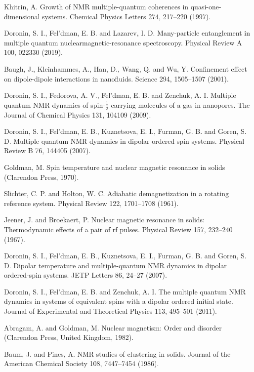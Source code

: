 \documentclass[utf8]{jetp}
\begin{document}
\begin{thebibliography}{35}
Khitrin, A. Growth of NMR multiple-quantum coherences in quasi-one-dimensional systems. Chemical
Physics Letters 274, 217–220 (1997).

Doronin, S. I., Fel'dman, E. B. and  Lazarev, I. D. Many-particle entanglement in multiple quantum nuclearmagnetic-resonance spectroscopy. Physical Review A 100, 022330 (2019).

Baugh, J., Kleinhammes, A., Han, D., Wang, Q. and  Wu, Y. Confinement effect on dipole-dipole interactions in nanofluids. Science 294, 1505–1507 (2001).

Doronin, S. I., Fedorova, A. V., Fel’dman, E. B. and  Zenchuk, A. I. Multiple quantum NMR dynamics of spin-$\frac 1 2$ carrying molecules of a gas in nanopores. The Journal of Chemical Physics 131, 104109 (2009).

Doronin, S. I., Fel’dman, E. B., Kuznetsova, E. I., Furman, G. B. and  Goren, S. D. Multiple quantum NMR dynamics in dipolar ordered spin systems. Physical Review B 76, 144405 (2007).

Goldman, M. Spin temperature and nuclear magnetic resonance in solids (Clarendon Press, 1970).

Slichter, C. P. and  Holton, W. C. Adiabatic demagnetization in a rotating reference system. Physical Review 122, 1701–1708 (1961).

Jeener, J. and  Broekaert, P. Nuclear magnetic resonance in solids: Thermodynamic effects of a pair of rf
pulses. Physical Review 157, 232–240 (1967).

Doronin, S. I., Fel’dman, E. B., Kuznetsova, E. I., Furman, G. B. and  Goren, S. D. Dipolar temperature and multiple-quantum NMR dynamics in dipolar ordered-spin systems. JETP Letters 86, 24–27 (2007).

Doronin, S. I., Fel’dman, E. B. and  Zenchuk, A. I. The multiple quantum NMR dynamics in systems of
equivalent spins with a dipolar ordered initial state. Journal of Experimental and Theoretical Physics 113, 495–501 (2011).

Abragam, A. and  Goldman, M. Nuclear magnetism: Order and disorder (Clarendon Press, United Kingdom,
1982).

Baum, J. and  Pines, A. NMR studies of clustering in solids. Journal of the American Chemical Society 108,
7447–7454 (1986).


\end{thebibliography}
\end{document}
